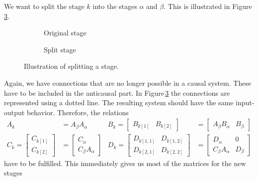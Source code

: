 \documentclass[numbers=noenddot,doctype=mastersthesis,BCOR=15mm,biblatex]{ldvbook}%
\begin{document}
We want to split the stage $k$ into the stages $\alpha$ and $\beta$.
This is illustrated in Figure\,\ref{fig:split_up}.
\begin{figure}[!htb]
	\centering
	
	\begin{subfigure}[b]{0.45\textwidth}
		\caption{Original stage}
		\label{fig:move_split_a}
	\end{subfigure}
	\hspace{0.8cm}
	\begin{subfigure}[b]{0.45\textwidth}
		\caption{Split stage}
		\label{fig:move_split_b}
	\end{subfigure}
	\caption{Illustration of splitting a stage.}
	\label{fig:split_up}
\end{figure}
Again, we have connections that are no longer possible in a causal system. 
These have to be included in the anticausal part. In Figure\,\ref{fig:split_up} the connections are represented using a dotted line.
The resulting system should have the same input-output behavior. Therefore, the relations
\begin{subequations}
	\begin{align}
	A_k&=A_\beta A_\alpha & B_k=\begin{bmatrix}B_{k[1]}&B_{k[2]}
	\end{bmatrix}&=\begin{bmatrix}A_\beta B_\alpha &
	B_\beta \end{bmatrix}\\
	C_k=\begin{bmatrix}C_{k[1]}\\C_{k[2]}
	\end{bmatrix}&=\begin{bmatrix}C_\alpha \\ C_\beta A_\alpha \end{bmatrix}&
	D_k=\begin{bmatrix}D_{k[1,1]}&D_{k[1,2]}\\D_{k[2,1]}&D_{k[2,2]}
	\end{bmatrix}&= \begin{bmatrix} D_\alpha & 0 \\ C_\beta A_\alpha & D_\beta \end{bmatrix}
	\end{align}\label{eq:relations}
\end{subequations}
have to be fulfilled.
This immediately gives us most of the matrices for the new stages
\end{document}
